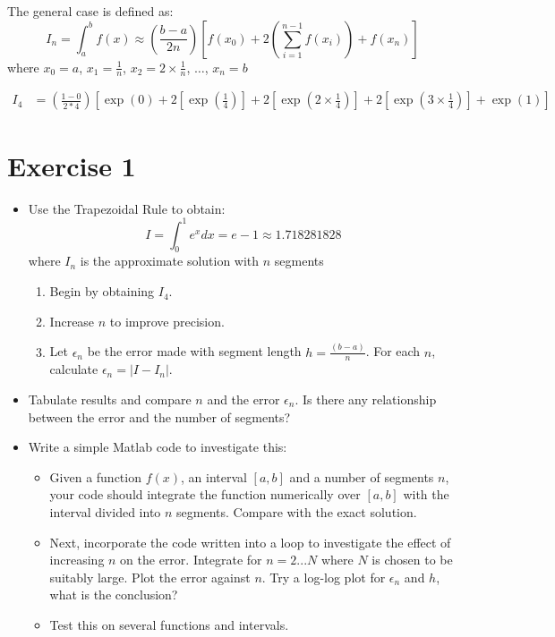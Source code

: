 \documentclass[10pt, a4paper]{article}
\begin{document}
\begin{tcolorbox}[colback=white]
    The general case is defined as: 
    $$
        I_n = \int_a^b f(x) \approx \left(\frac{b-a}{2n}\right)\left[f(x_0)+2\left(\sum_{i=1}^{n-1}f(x_i)\right)+f(x_n)\right]
    $$
    where $x_0 = a$, $x_1 = \frac{1}{n}$, $x_2 = 2 \times \frac{1}{n}$, $\dots$, $x_n = b$
\end{tcolorbox}

\begin{align*}
    I_4 &= \left(\frac{1-0}{2*4}\right)\left[\exp(0)+2\left[\exp(\frac{1}{4})\right]+2\left[\exp(2\times\frac{1}{4})\right]+2\left[\exp(3\times\frac{1}{4})\right]+\exp(1)\right]
\end{align*}

\section{Exercise 1}

\begin{itemize}
    \item Use the Trapezoidal Rule to obtain:
    $$
        I=\int_0^1 e^x dx = e - 1 \approx 1.718281828
    $$
    where $I_n$ is the approximate solution with $n$ segments 
    \begin{enumerate}
        \item Begin by obtaining $I_4$.
        \item Increase $n$ to improve precision.
        \item Let $\epsilon_n$ be the error made with segment length $h=\frac{(b-a)}{n}$. For each
        $n$, calculate $\epsilon_n=|I-I_n|$.
    \end{enumerate}
    \item Tabulate results and compare $n$ and the error $\epsilon_n$. Is there any relationship
    between the error and the number of segments? 
    \item Write a simple Matlab code to investigate this:
    \begin{itemize}
        \item Given a function $f(x)$, an interval $[a,b]$ and a number of segments $n$, your code
        should integrate the function numerically over $[a,b]$ with the interval divided
        into $n$ segments. Compare with the exact solution. 
        \item Next, incorporate the code written into a loop to investigate the effect of increasing
        $n$ on the error. Integrate for $n=2...N$ where $N$ is chosen to be suitably large. Plot the
        error against $n$. Try a log-log plot for $\epsilon_n$ and $h$, what is the conclusion?
        \item Test this on several functions and intervals.
    \end{itemize}
\end{itemize}
\end{document}
